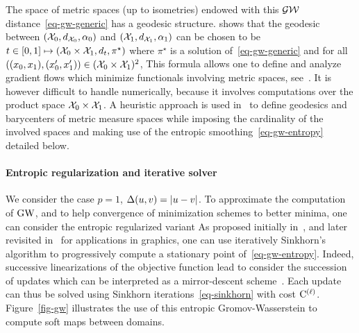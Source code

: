 \begin{rem}
The space of metric spaces (up to isometries) endowed with this $\operatorname{\mathcal{GW}}$ distance~\eqref{eq-gw-generic} has a geodesic structure. \cite{SturmGW} shows that the geodesic between  $(\mathcal{X}_0,d_{\mathcal{X}_0},\alpha_0)$ and $(\mathcal{X}_1,d_{\mathcal{X}_1},\alpha_1)$ can be chosen to be 
$t \in [0,1] \mapsto (\mathcal{X}_0 \times \mathcal{X}_1,d_t,\pi^\star)$ where $\pi^\star$ is a solution of~\eqref{eq-gw-generic} and for all $((x_0,x_1), (x_0',x_1')) \in (\mathcal{X}_0 \times \mathcal{X}_1)^2$, 
This formula allows one to define and analyze gradient flows which minimize functionals involving metric spaces, see~\cite{SturmGW}. It is however difficult to handle numerically, because it involves computations over the product space $\mathcal{X}_0 \times \mathcal{X}_1$. 
%
A heuristic approach is used in~\cite{peyre2016gromov} to define geodesics and barycenters of metric measure spaces while imposing the cardinality of the involved spaces and making use of the entropic smoothing~\eqref{eq-gw-entropy} detailed below.
\end{rem}

\paragraph{Entropic regularization and iterative solver}

We consider the case $p=1$, $\Delta(u,v)=|u-v|$.
%
To approximate the computation of $\operatorname{\mathrm{GW}}$, and to help convergence of minimization schemes to better minima, one can consider the entropic regularized variant
As proposed initially in~\cite{gold-1996,rangarajan-1999}, and later revisited in~\cite{2016-solomon-gw} for applications in graphics, one can use iteratively Sinkhorn's algorithm to progressively compute a stationary point of~\eqref{eq-gw-entropy}. 
%
Indeed, successive linearizations of the objective function lead to consider the succession of updates
\eql{\label{eq-gw-sinkh}
	\itt{\P} \eqdef \umin{ \P \in \CouplingsD(\a,\b) } \dotp{\P}{\it{\C}} - \epsilon\H(\P)
		\qwhereq
}
which can be interpreted as a mirror-descent scheme~\cite{2016-solomon-gw}. Each update can thus be solved using Sinkhorn iterations~\eqref{eq-sinkhorn} with cost $\mathrm{C}^{(\ell)}$. Figure~\eqref{fig-gw} illustrates the use of this entropic Gromov-Wasserstein to compute soft maps between domains. 



